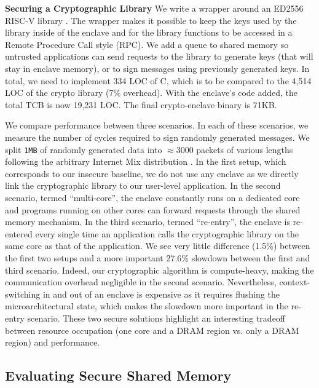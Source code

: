 \textbf{Securing a Cryptographic Library}
\label{sec:evalcrypto}
We write a wrapper around an ED2556 RISC-V library \cite{ed25519github}.
The wrapper makes it possible to keep the keys used by the library inside of the enclave and for the library functions to be accessed in a Remote Procedure Call style (RPC).
We add a queue to shared memory so untrusted applications can send requests to the library to generate keys (that will stay in enclave memory), or to sign messages using previously generated keys.
In total, we need to implement 334 LOC of C, which is to be compared to the 4,514 LOC of the crypto library (7\% overhead).
With the enclave's code added, the total TCB is now 19,231 LOC.
The final crypto-enclave binary is 71KB.

We compare performance between three scenarios.
In each of these scenarios, we measure the number of cycles required to sign randomly generated messages.
We split \texttt{1MB} of randomly generated data into $\approx 3000$ packets of various lengths following the arbitrary Internet Mix distribution \cite{imix}.
In the first setup, which corresponds to our insecure baseline, we do not use any enclave as we directly link the cryptographic library to our user-level application.
In the second scenario, termed ``multi-core'', the enclave constantly runs on a dedicated core and programs running on other cores can forward requests through the shared memory mechanism.
In the third scenario, termed ``re-entry'', the enclave is re-entered every single time an application calls the cryptographic library on the same core as that of the application.
We see very little difference (1.5\%) between the first two setups and a more important 27.6\% slowdown between the first and third scenario.
Indeed, our cryptographic algorithm is compute-heavy, making the communication overhead negligible in the second scenario.
Nevertheless, context-switching in and out of an enclave is expensive as it requires flushing the microarchitectural state, which makes the slowdown more important in the re-entry scenario.
These two secure solutions highlight an interesting tradeoff between resource occupation (one core and a DRAM region vs. only a DRAM region) and performance.

\subsection{Evaluating Secure Shared Memory}


